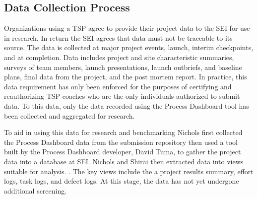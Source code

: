   
  

\subsection{Data Collection Process}



Organizations using a TSP agree to provide their project data to the SEI for use in research. In return the SEI agrees    that  data must not be traceable to its source. The data is collected at major project events, launch, interim checkpoints, and at completion. Data includes project and site  characteristic summaries, surveys of team members, launch presentations, launch outbriefs, and baseline plans, final data from the project, and the post mortem report.  In practice, this data requirement has only been enforced for the purposes of certifying and reauthorizing TSP coaches who are the only individuals authorized to submit data. To this data, only the data recorded using the Process Dashboard tool has been collected and aggregated for research. 

To aid in using this data for research and benchmarking  Nichols first collected the Process Dashboard data from the submission repository then used a tool built by the Process Dashboard developer, David Tuma, 
to gather the project data into a database at SEI. Nichols and Shirai then extracted data into views suitable for analysis. . The key views include the a project results summary, effort logs, task logs, and defect logs. At this stage, the data has not yet undergone additional screening. 


